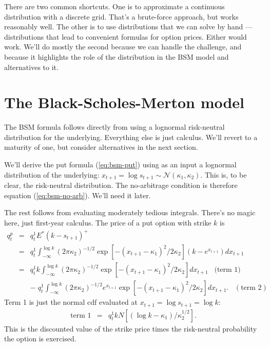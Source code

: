 \documentclass[11pt]{article}
\begin{document}
There are two common shortcuts.
One is to approximate a continuous distribution with a discrete grid.  
That's a brute-force approach, but works reasonably well.
The other is to use distributions that we can solve by hand ---
distributions that lead to convenient formulas for option prices.  
Either would work.    
We'll do mostly the second because we can handle the challenge,
and because it highlights the role of the distribution in 
the BSM model and alternatives to it.


\section{The Black-Scholes-Merton model}


The BSM formula follows directly from using a lognormal risk-neutral distribution
for the underlying.  Everything else is just calculus.
We'll revert to a maturity of one, but consider alternatives in the next section.

We'll derive the put formula (\ref{eq:bsm-put})
using as an input a lognormal distribution
of the underlying:
$x_{t+1} = \log s_{t+1} \sim \mathcal{N} (\kappa_1,\kappa_2)$.
This is, to be clear, the risk-neutral distribution.
The no-arbitrage condition is therefore equation (\ref{eq:bsm-no-arb}).
We'll need it later.

The rest follows from evaluating moderately tedious integrals.
There's no magic here, just first-year calculus.
The price of a put option with strike $k$ is
\begin{eqnarray*}
    q^p_t &=&  q^1_t E^* (k - s_{t+1})^+  \\
            &=& q^1_t \int_{-\infty}^{\log k} (2 \pi \kappa_2)^{-1/2}
                    \exp[ - (x_{t+1} - \kappa_1)^2/2\kappa_2]
                    \left( k - e^{x_{t+1}} \right) d x_{t+1} \\
            &=& q^1_t k \int_{-\infty}^{\log k} (2 \pi \kappa_2)^{-1/2}
                    \exp[ - (x_{t+1} - \kappa_1)^2/2\kappa_2] d x_{t+1}
                    \;\;\; \mbox{(term 1)}\\
            &&    - \; q^1_t \int_{-\infty}^{\log k} (2 \pi \kappa_2)^{-1/2}
                    e^{x_{t+1}} \exp[ - (x_{t+1} - \kappa_1)^2/2\kappa_2] d x_{t+1} .
                     \;\;\; (\mbox{term 2})
\end{eqnarray*}
Term 1 is just the normal cdf evaluated at $x_{t+1} = \log s_{t+1} = \log k$:
\begin{eqnarray*}
    \mbox{term 1} &=&  q^1_t k N [ (\log k - \kappa_1)/\kappa_2^{1/2}] .
\end{eqnarray*}
This is the discounted value of the strike price times
the risk-neutral probability the option is exercised.
\end{document}

